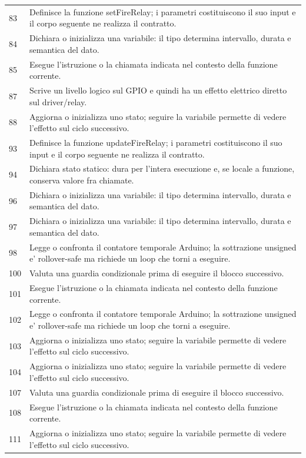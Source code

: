 \documentclass[11pt,a4paper]{article}
\begin{document}
\begin{longtable}{p{}p{}}
83 & Definisce la funzione setFireRelay; i parametri costituiscono il suo input e il corpo seguente ne realizza il contratto. \\
84 & Dichiara o inizializza una variabile: il tipo determina intervallo, durata e semantica del dato. \\
85 & Esegue l'istruzione o la chiamata indicata nel contesto della funzione corrente. \\
87 & Scrive un livello logico sul GPIO e quindi ha un effetto elettrico diretto sul driver/relay. \\
88 & Aggiorna o inizializza uno stato; seguire la variabile permette di vedere l'effetto sul ciclo successivo. \\
93 & Definisce la funzione updateFireRelay; i parametri costituiscono il suo input e il corpo seguente ne realizza il contratto. \\
94 & Dichiara stato statico: dura per l'intera esecuzione e, se locale a funzione, conserva valore fra chiamate. \\
96 & Dichiara o inizializza una variabile: il tipo determina intervallo, durata e semantica del dato. \\
97 & Dichiara o inizializza una variabile: il tipo determina intervallo, durata e semantica del dato. \\
98 & Legge o confronta il contatore temporale Arduino; la sottrazione unsigned e' rollover-safe ma richiede un loop che torni a eseguire. \\
100 & Valuta una guardia condizionale prima di eseguire il blocco successivo. \\
101 & Esegue l'istruzione o la chiamata indicata nel contesto della funzione corrente. \\
102 & Legge o confronta il contatore temporale Arduino; la sottrazione unsigned e' rollover-safe ma richiede un loop che torni a eseguire. \\
103 & Aggiorna o inizializza uno stato; seguire la variabile permette di vedere l'effetto sul ciclo successivo. \\
104 & Aggiorna o inizializza uno stato; seguire la variabile permette di vedere l'effetto sul ciclo successivo. \\
107 & Valuta una guardia condizionale prima di eseguire il blocco successivo. \\
108 & Esegue l'istruzione o la chiamata indicata nel contesto della funzione corrente. \\
111 & Aggiorna o inizializza uno stato; seguire la variabile permette di vedere l'effetto sul ciclo successivo. \\

\end{longtable}
\end{document}
